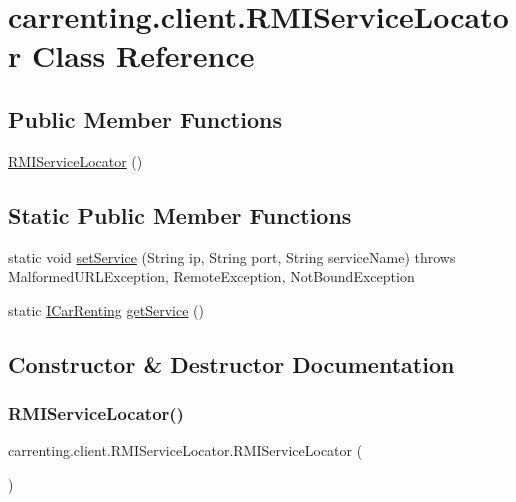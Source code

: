 \hypertarget{classcarrenting_1_1client_1_1_r_m_i_service_locator}{}\section{carrenting.\+client.\+R\+M\+I\+Service\+Locator Class Reference}
\label{classcarrenting_1_1client_1_1_r_m_i_service_locator}
\subsection*{Public Member Functions}
\begin{DoxyCompactItemize}
\item 
\mbox{\hyperlink{classcarrenting_1_1client_1_1_r_m_i_service_locator_a67b8bd96660833416ebcdde80840b2e6}{R\+M\+I\+Service\+Locator}} ()
\end{DoxyCompactItemize}
\subsection*{Static Public Member Functions}
\begin{DoxyCompactItemize}
\item 
static void \mbox{\hyperlink{classcarrenting_1_1client_1_1_r_m_i_service_locator_a334261a803c2de0ef14d82c998a39e85}{set\+Service}} (String ip, String port, String service\+Name)  throws Malformed\+U\+R\+L\+Exception, Remote\+Exception, Not\+Bound\+Exception 
\item 
static \mbox{\hyperlink{interfacecarrenting_1_1server_1_1_i_car_renting}{I\+Car\+Renting}} \mbox{\hyperlink{classcarrenting_1_1client_1_1_r_m_i_service_locator_a0ac0c6fa2786c97632c927749a53237c}{get\+Service}} ()
\end{DoxyCompactItemize}


\subsection{Constructor \& Destructor Documentation}
\mbox{\label{classcarrenting_1_1client_1_1_r_m_i_service_locator_a67b8bd96660833416ebcdde80840b2e6}} 
\subsubsection{\texorpdfstring{RMIServiceLocator()}{RMIServiceLocator()}}
{\footnotesize\ttfamily carrenting.\+client.\+R\+M\+I\+Service\+Locator.\+R\+M\+I\+Service\+Locator (\begin{DoxyParamCaption}{ }\end{DoxyParamCaption})}



